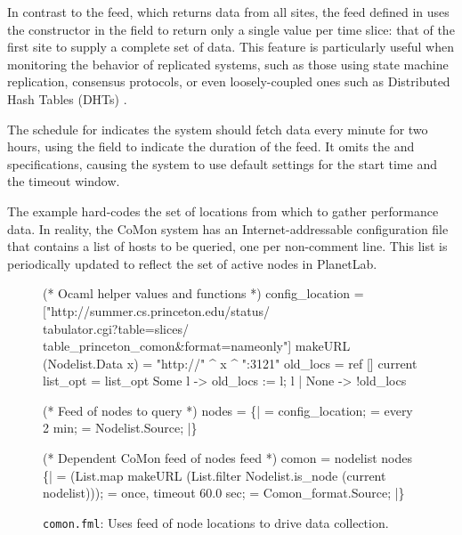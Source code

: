 In contrast to the  feed, which returns data from
all sites, the  feed defined in 
uses the  constructor in the  field to 
return only a single value per time slice: that of the first site to
supply a complete set of data.
%
%
This feature is particularly useful when monitoring the
behavior of replicated systems, such as those using
state machine replication, consensus protocols, or even
loosely-coupled ones such as Distributed Hash Tables (DHTs) 
\cite{Balakrishnan+03:dht}.

The schedule for  indicates the system should fetch data
every minute for two hours, using the  field to indicate
the duration of the feed.  It omits the  and
 specifications, causing the system to use default
settings for the start time and the timeout window.  



The  example hard-codes the set of locations from
which to gather performance data.  In reality, the CoMon system has an
Internet-addressable configuration file that contains a list of hosts
to be queried, one per non-comment line. This list is periodically
updated to reflect the set of active nodes in PlanetLab. 



\begin{figure}[t]
\begin{code}
(* Ocaml helper values and functions *)
 config_location = 
 ["http://summer.cs.princeton.edu/status/ \\
   tabulator.cgi?table=slices/ \\
   table_princeton_comon&format=nameonly"]
 makeURL (Nodelist.Data x) = 
     "http://" ^ x ^ ":3121"
 old_locs = ref []
 current list_opt =
   list_opt 
    Some l ->  old_locs := l; l
  | None   -> !old_locs

(* Feed of nodes to query *)
 nodes =  
   \{|
      =  config_location;
     = every 2 min;
       = Nodelist.Source;
  |\}

(* Dependent CoMon feed of nodes feed *)
 comon =
   nodelist  nodes 
     \{|
        =  
          (List.map makeURL 
          (List.filter Nodelist.is_node 
          (current nodelist)));
       = once, timeout 60.0 sec; 
         = Comon_format.Source;
    |\}
\end{code}
\shrink
\caption{\texttt{comon.fml}: Uses feed of node locations to drive
  data collection.} \shrink
\label{fig:feedcomon}
\end{figure}

